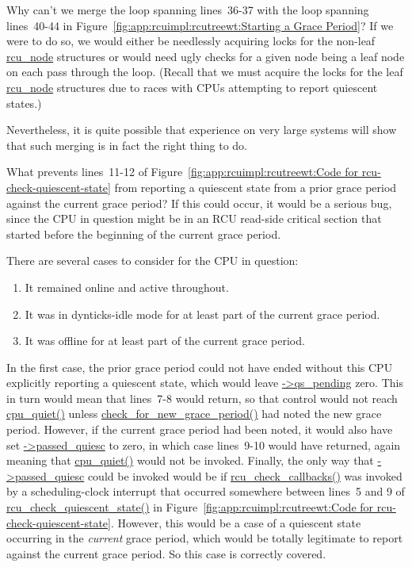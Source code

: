 \QuickQ{}
	Why can't we merge the loop spanning lines~36-37 with
	the loop spanning lines~40-44 in
	Figure~\ref{fig:app:rcuimpl:rcutreewt:Starting a Grace Period}?
\QuickA{}
	If we were to do so, we would either be needlessly acquiring locks
	for the non-leaf \url{rcu_node} structures or would need
	ugly checks for a given node being a leaf node on each pass
	through the loop.
	(Recall that we must acquire the locks for the leaf
	\url{rcu_node} structures due to races with CPUs attempting
	to report quiescent states.)

	Nevertheless, it is quite possible that experience on very large
	systems will show that such merging is in fact the right thing
	to do.

\QuickQ{}
	What prevents lines~11-12 of
	Figure~\ref{fig:app:rcuimpl:rcutreewt:Code for rcu-check-quiescent-state}
	from reporting a quiescent state from a prior
	grace period against the current grace period?
\QuickA{}
	If this could occur, it would be a serious bug, since the
	CPU in question might be in an RCU read-side critical section
	that started before the beginning of the current grace period.

	There are several cases to consider for the CPU in question:
	\begin{enumerate}
	\item	It remained online and active throughout.
	\item	It was in dynticks-idle mode for at least part of the current
		grace period.
	\item	It was offline for at least part of the current grace period.
	\end{enumerate}

	In the first case, the prior grace period could not have
	ended without this CPU explicitly reporting a quiescent
	state, which would leave \url{->qs_pending} zero.
	This in turn would mean that lines~7-8 would return, so
	that control would not reach \url{cpu_quiet()} unless
	\url{check_for_new_grace_period()} had noted the new grace
	period.
	However, if the current grace period had been noted, it would
	also have set \url{->passed_quiesc} to zero, in which case
	lines~9-10 would have returned, again meaning that \url{cpu_quiet()}
	would not be invoked.
	Finally, the only way that \url{->passed_quiesc} could be invoked
	would be if \url{rcu_check_callbacks()} was invoked by
	a scheduling-clock interrupt that occurred somewhere between
	lines~5 and 9 of \url{rcu_check_quiescent_state()} in
	Figure~\ref{fig:app:rcuimpl:rcutreewt:Code for rcu-check-quiescent-state}.
	However, this would be a case of a quiescent state occurring
	in the \emph{current} grace period, which would be totally
	legitimate to report against the current grace period.
	So this case is correctly covered.

